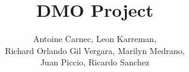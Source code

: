 \documentclass{article}
\title{DMO Project}
\author{
Antoine Carnec,
Leon Karreman, \\
Richard Orlando Gil Vergara,
Marilyn Medrano, \\
Juan Piccio,
Ricardo Sanchez}
\date{}
\theoremstyle{definition}
\theoremstyle{exercise}
\theoremstyle{remark}
\begin{document}
\maketitle
\noindent









%
\end{document}

